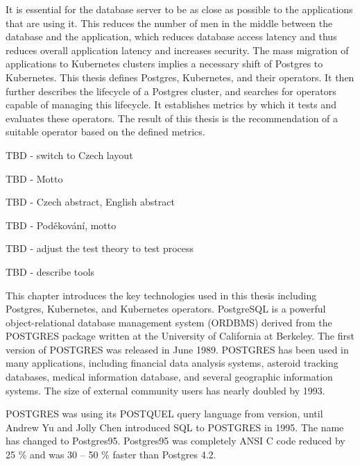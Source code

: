 
It is essential for the database server to be as close as possible to the applications that are using it. This reduces the number of men in the middle between the database and the application, which reduces database access latency and thus reduces overall application latency and increases security. The mass migration of applications to Kubernetes clusters implies a necessary shift of Postgres to Kubernetes. This thesis defines Postgres, Kubernetes, and their operators. It then further describes the lifecycle of a Postgres cluster, and searches for operators capable of managing this lifecycle. It establishes metrics by which it tests and evaluates these operators.  The result of this thesis is the recommendation of a suitable operator based on the defined metrics.

TBD - switch to Czech layout

TBD - Motto

TBD - Czech abstract, English abstract

TBD - Poděkování, motto

TBD - adjust the test theory to test process

TBD - describe tools


\sloppy
{}
This chapter introduces the key technologies used in this thesis including Postgres, Kubernetes, and Kubernetes operators.
PostgreSQL is a powerful object-relational database management system (ORDBMS) derived from the POSTGRES package written at the University of California at Berkeley. \cite{docuPgwhatIsPg} \cite{pg14introduction} The first version of POSTGRES was released in June 1989. POSTGRES has been used in many applications, including financial data analysis systems, asteroid tracking databases, medical information database, and several geographic information systems. The size of external community users has nearly doubled by 1993. \cite{docuPgBriefHistory}

POSTGRES was using its POSTQUEL query language from version, until Andrew Yu and Jolly Chen introduced SQL to POSTGRES in 1995. The name has changed to Postgres95. Postgres95 was completely ANSI C code reduced by 25 \% and was 30 – 50 \% faster than Postgres 4.2.  \cite{docuPgBriefHistory}

